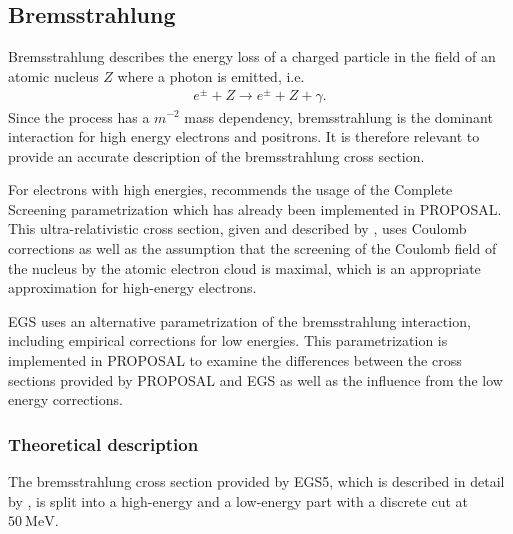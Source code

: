 \subsection{Bremsstrahlung}
\label{sec:brems}

Bremsstrahlung describes the energy loss of a charged particle in the field of an atomic nucleus $Z$ where a photon is emitted, i.e.\
%
\begin{align*}
	e^{\pm} + Z \rightarrow e^{\pm} + Z + \gamma.
\end{align*}
%
Since the process has a $m^{-2}$ mass dependency, bremsstrahlung is the dominant interaction for high energy electrons and positrons.
It is therefore relevant to provide an accurate description of the bremsstrahlung cross section.

For electrons with high energies, \cite{Kohne:2013zbq} recommends the usage of the Complete Screening parametrization which has already been implemented in PROPOSAL.
This ultra-relativistic cross section, given and described by \cite{RevModPhys.46.815}, uses Coulomb corrections as well as the assumption that the screening of the Coulomb field of the nucleus by the atomic electron cloud is maximal, which is an appropriate approximation for high-energy electrons.

EGS uses an alternative parametrization of the bremsstrahlung interaction, including empirical corrections for low energies.
This parametrization is implemented in PROPOSAL to examine the differences between the cross sections provided by PROPOSAL and EGS as well as the influence from the low energy corrections.

\subsubsection{Theoretical description}

The bremsstrahlung cross section provided by EGS5, which is described in detail by \cite{Hirayama:2005zm}, is split into a high-energy and a low-energy part with a discrete cut at $\SI{50}{\mega\electronvolt}$.

